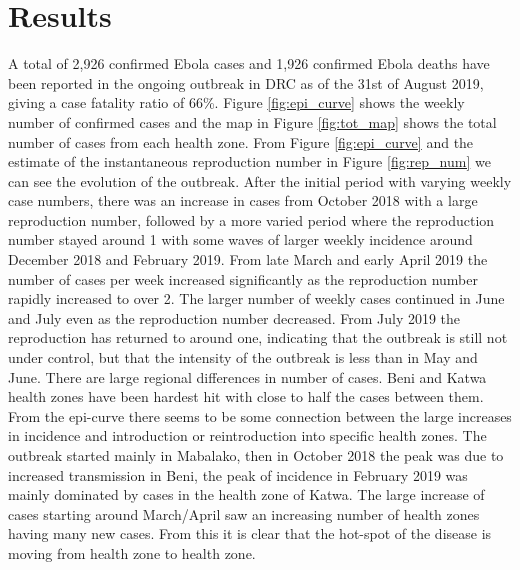 \documentclass[12pt]{article}
\begin{document}
\section{Results}

A total of 2,926 confirmed Ebola cases and 1,926 confirmed Ebola deaths have been reported in the ongoing outbreak in DRC as of the 31st of August 2019, giving a case fatality ratio of 66\%. Figure \ref{fig:epi_curve} shows the weekly number of confirmed cases and the map in Figure \ref{fig:tot_map} shows the total number of cases from each health zone. From Figure \ref{fig:epi_curve} and the estimate of the instantaneous reproduction number in Figure \ref{fig:rep_num} we can see the evolution of the outbreak. After the initial period with varying weekly case numbers, there was an increase in cases from October 2018 with a large reproduction number, followed by a more varied period where the reproduction number stayed around 1 with some waves of larger weekly incidence around December 2018 and February 2019. From late March and early April 2019 the number of cases per week increased significantly as the reproduction number rapidly increased to over 2. The larger number of weekly cases continued in June and July even as the reproduction number decreased. From July 2019 the reproduction has returned to around one, indicating that the outbreak is still not under control, but that the intensity of the outbreak is less than in May and June. There are large regional differences in number of cases. Beni and Katwa health zones have been hardest hit with close to half the cases between them. From the epi-curve there seems to be some connection between the large increases in incidence and introduction or reintroduction into specific health zones. The outbreak started mainly in Mabalako, then in October 2018 the peak was due to increased transmission in Beni, the peak of incidence in February 2019 was mainly dominated by cases in the health zone of Katwa. The large increase of cases starting around March/April saw an increasing number of health zones having many new cases. From this it is clear that the hot-spot of the disease is moving from health zone to health zone.
\end{document}
